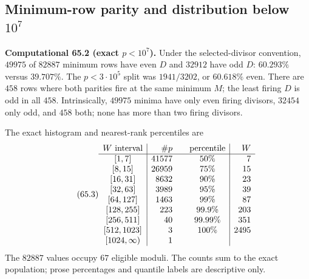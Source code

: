 \documentclass[10pt,reqno]{amsart}
\theoremstyle{definition}
\newcommand{\1}{\mathbf 1}
\begin{document}
\subsection{Minimum-row parity and distribution below $10^7$}
\medskip\noindent\textbf{Computational 65.2 (exact $p<10^7$).}
Under the selected-divisor convention, $49975$ of $82887$ minimum rows have
even $D$ and $32912$ have odd $D$: $60.293\%$ versus $39.707\%$.  The
$p<3\cdot10^5$ split was $1941/3202$, or $60.618\%$ even.  There are $458$
rows where both parities fire at the same minimum $M$; the least firing $D$
is odd in all $458$.  Intrinsically, $49975$ minima have only even firing
divisors, $32454$ only odd, and $458$ both; none has more than two firing
divisors.

The exact histogram and nearest-rank percentiles are
\begin{equation}\tag{65.3}
\begin{array}{c|r@{\qquad}c|r}
W\text{ interval}&\#p&\text{percentile}&W\\ \hline
{[1,7]}&41577&50\%&7\\
{[8,15]}&26959&75\%&15\\
{[16,31]}&8632&90\%&23\\
{[32,63]}&3989&95\%&39\\
{[64,127]}&1463&99\%&87\\
{[128,255]}&223&99.9\%&203\\
{[256,511]}&40&99.99\%&351\\
{[512,1023]}&3&100\%&2495\\
{[1024,\mathord\infty)}&1&&
\end{array}
\end{equation}
The $82887$ values occupy $67$ eligible moduli.  The counts sum to the exact
population; prose percentages and quantile labels are descriptive only.
\end{document}
